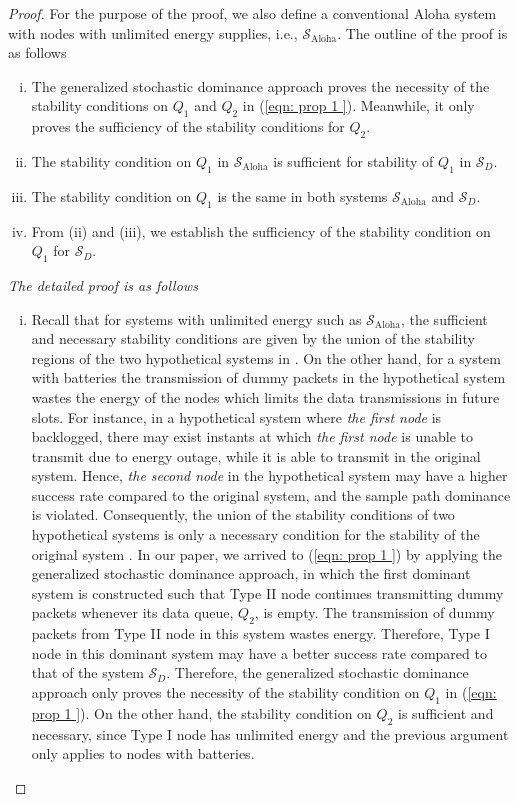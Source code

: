 \documentclass[draftcls,12pt,onecolumn]{IEEEtran}
\begin{document}
\begin{proof}
For the purpose of the proof, we also define a conventional Aloha system with nodes with unlimited energy supplies, i.e., $\mathcal{S}_{\text{Aloha}} $.
The outline of the proof is as follows \begin{enumerate}[(i)] \item The generalized stochastic dominance approach proves the necessity of the stability conditions on $Q_1$ and $Q_2$ in (\ref{eqn: prop 1 }). Meanwhile, it only proves the sufficiency of the stability conditions for $Q_2$.  \item The stability condition on $ Q_1$ in $\mathcal{S}_{\text{Aloha}} $ is sufficient for stability of $Q_1$ in $\mathcal{S}_D$. \item The stability condition on $Q_1$ is the same in both systems $\mathcal{S}_{\text{Aloha}} $ and $\mathcal{S}_D $. \item From (ii) and (iii), we establish the sufficiency of the stability condition on $Q_1$ for $\mathcal{S}_D$.   \end{enumerate}

\textit{The detailed proof is as follows}
\begin{enumerate}[(i)]
\item Recall that for systems with unlimited energy such as $ \mathcal{S}_{\text{Aloha}}$, the sufficient and necessary stability conditions are given by the union of the stability regions of the two hypothetical systems in \cite{rao1988stability}. On the other hand, for a system with batteries the transmission of dummy packets in the hypothetical system wastes the energy of the nodes which limits the data transmissions in future slots. For instance, in a hypothetical system where \emph{the first node} is backlogged, there may exist instants at which \emph{the first node} is unable to transmit due to energy outage, while it is able to transmit in the original system. Hence, \emph{the second node} in the hypothetical system may have a higher success rate compared to the original system, and the sample path dominance is violated. Consequently, the union of the stability conditions of two hypothetical systems is only a necessary condition for the stability of the original system \cite{jeon2015stability}. 
In our paper, we arrived to (\ref{eqn: prop 1 }) by applying the generalized stochastic dominance approach, in which the first dominant system is constructed such that Type II node continues transmitting dummy packets whenever its data queue, $Q_2$, is empty. The transmission of dummy packets from Type II node in this system wastes energy. Therefore, Type I node in this dominant system may have a better success rate compared to that of the system $\mathcal{S}_D$. Therefore, the generalized stochastic dominance approach only proves the necessity of the stability condition on $Q_1$ in (\ref{eqn: prop 1 }). On the other hand, the stability condition on $Q_2$ is sufficient and necessary, since Type I node has unlimited energy and the previous argument only applies to nodes with batteries.


\end{enumerate}
\end{proof}
\end{document}
